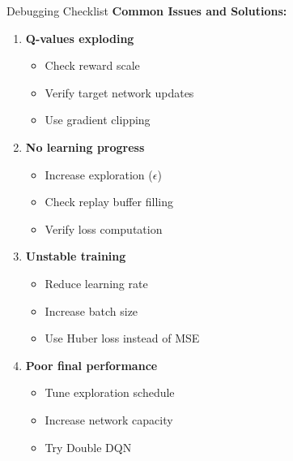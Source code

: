 \documentclass[aspectratio=169,10pt]{beamer}
\begin{document}
\begin{frame}{Debugging Checklist}
\textbf{Common Issues and Solutions:}
\begin{enumerate}
    \item \textbf{Q-values exploding}
    \begin{itemize}
        \item Check reward scale
        \item Verify target network updates
        \item Use gradient clipping
    \end{itemize}
    
    \item \textbf{No learning progress}
    \begin{itemize}
        \item Increase exploration ($\epsilon$)
        \item Check replay buffer filling
        \item Verify loss computation
    \end{itemize}
    
    \item \textbf{Unstable training}
    \begin{itemize}
        \item Reduce learning rate
        \item Increase batch size
        \item Use Huber loss instead of MSE
    \end{itemize}
    
    \item \textbf{Poor final performance}
    \begin{itemize}
        \item Tune exploration schedule
        \item Increase network capacity
        \item Try Double DQN
    \end{itemize}
\end{enumerate}
\end{frame}
\end{document}
